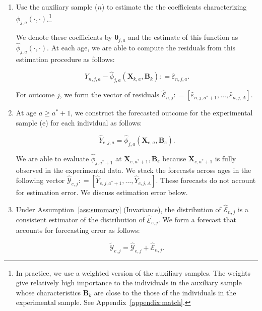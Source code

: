 \begin{enumerate}
\item Use the auxiliary sample ($n$) to estimate the the coefficients characterizing $\phi_{j,a} \left( \cdot , \cdot \right)$.\footnote{In practice, we use a weighted version of the auxiliary samples. The weights give relatively high importance to the individuals in the auxiliary sample whose characteristics $\bm{B}_k$ are close to the those of the individuals in the experimental sample. See Appendix~\ref{appendix:match}.}

We denote these coefficients by $\bm{\theta}_{j,a}$ and the estimate of this function as $\hat{\phi}_{j,a} \left( \cdot , \cdot \right)$. At each age, we are able to compute the residuals from this estimation procedure as follows:

\begin{equation}
Y_{n,j,a} -  \hat{\phi}_{j,a} (\bm{X}_{k,a}, \bm{B}_k) : = \hat{\varepsilon}_{n,j,a}.
\end{equation}

\noindent For outcome $j$, we form the vector of residuals $\hat{\mathcal{E}}_{n,j} : = \left[ \hat{\varepsilon}_{n,j,a^*+1}, \ldots, \hat{\varepsilon}_{n,j,A} \right]$.

\item At age $a \geq a^*+1$, we construct the forecasted outcome for the experimental sample (e) for each individual as follows:

\begin{equation}
\hat{Y}_{e,j,a} = \hat{\phi}_{j,a} \left( \bm{X}_{e,a}, \bm{B}_e \right).
\end{equation}

\noindent We are able to evaluate $\hat{\phi}_{j,a^*+1}$ at $ \bm{X}_{e,a^*+1}, \bm{B}_e $ because $\bm{X}_{e,a^*+1}$ is fully observed in the experimental data. We stack the forecasts across ages in the following vector $\hat{\mathcal{Y}}_{e,j} : = \left[ \hat{Y}_{e,j,a^*+1}, \ldots,  \hat{Y}_{e,j,A} \right]$. These forecasts do not account for estimation error. We discuss estimation error below.

\item Under Assumption~\ref{ass:summary} (Invariance), the distribution of $\hat{\mathcal{E}}_{n,j}$ is a consistent estimator of the distribution of $\hat{\mathcal{E}}_{e,j}$. We form a forecast that accounts for forecasting error as follows:

\begin{equation}
\tilde{\mathcal{Y}}_{e,j} = \hat{\mathcal{Y}}_{e,j} + \hat{\mathcal{E}}_{n,j}.
\end{equation}


\end{enumerate}
